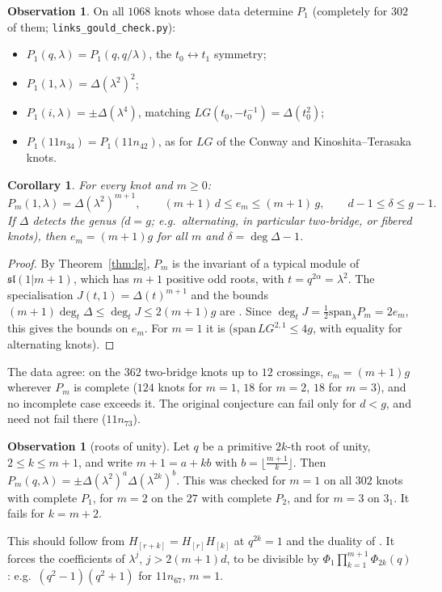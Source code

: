 \documentclass[11pt]{article}
\newtheorem{corollary}[theorem]{Corollary}
\theoremstyle{definition}
\newtheorem{observation}[theorem]{Observation}
\theoremstyle{remark}
\begin{document}
\begin{observation}\label{obs:lgchecks}
On all $1068$ knots whose data determine $P_1$ (completely for $302$ of them; \texttt{links\_gould\_check.py}):
\begin{itemize}
\item[(i)] $P_1(q,\lambda)=P_1(q,q/\lambda)$, the $t_0\leftrightarrow t_1$ symmetry;
\item[(ii)] $P_1(1,\lambda)=\Delta(\lambda^2)^2$;
\item[(iii)] $P_1(i,\lambda)=\pm\Delta(\lambda^4)$, matching $LG(t_0,-t_0^{-1})=\Delta(t_0^2)$;
\item[(iv)] $P_1(11n_{34})=P_1(11n_{42})$, as for $LG$ of the Conway and Kinoshita--Terasaka knots.
\end{itemize}
\end{observation}

\begin{corollary}\label{cor:bounds}
For every knot and $m\ge0$:
\[
 P_m(1,\lambda)=\Delta(\lambda^2)^{m+1},\qquad (m+1)\,d\le e_m\le(m+1)\,g,\qquad d-1\le\delta\le g-1 .
\]
If $\Delta$ detects the genus ($d=g$; e.g.\ alternating, in particular two-bridge, or fibered knots), then
$e_m=(m+1)g$ for all $m$ and $\delta=\deg\Delta-1$.
\end{corollary}
\begin{proof}
By Theorem~\ref{thm:lg}, $P_m$ is the invariant of a typical module of $\mathfrak{sl}(1|m+1)$, which has $m+1$
positive odd roots, with $t=q^{2\alpha}=\lambda^2$.  The specialisation $J(t,1)=\Delta(t)^{m+1}$ and the bounds
$(m+1)\deg_t\Delta\le\deg_tJ\le2(m+1)g$ are \cite[Thms.~1.1, 1.2, Cor.~1.3]{LNG}.  Since
$\deg_tJ=\frac12\mathrm{span}_\lambda P_m=2e_m$, this gives the bounds on $e_m$.  For $m=1$ it is \cite{KT}
($\mathrm{span}\,LG^{2,1}\le4g$, with equality for alternating knots).
\end{proof}

The data agree: on the $362$ two-bridge knots up to $12$ crossings, $e_m=(m+1)g$ wherever $P_m$ is complete
($124$ knots for $m=1$, $18$ for $m=2$, $18$ for $m=3$), and no incomplete case exceeds it.  The original conjecture
can fail only for $d<g$, and need not fail there ($11n_{73}$).

\begin{observation}[roots of unity]\label{obs:roots}
Let $q$ be a primitive $2k$-th root of unity, $2\le k\le m+1$, and write $m+1=a+kb$ with $b=\lfloor\frac{m+1}k\rfloor$.
Then $P_m(q,\lambda)=\pm\Delta(\lambda^2)^a\Delta(\lambda^{2k})^b$.  This was checked for $m=1$ on all $302$
knots with complete $P_1$, for $m=2$ on the $27$ with complete $P_2$, and for $m=3$ on $3_1$.  It fails for
$k=m+2$.
\end{observation}
This should follow from $H_{[r+k]}=H_{[r]}H_{[k]}$ at $q^{2k}=1$ and the duality of \cite{KM-roots}.  It forces
the coefficients of $\lambda^j$, $j>2(m+1)d$, to be divisible by $\Phi_1\prod_{k=1}^{m+1}\Phi_{2k}(q)$: e.g.\
$(q^2-1)(q^2+1)$ for $11n_{67}$, $m=1$.
\end{document}
